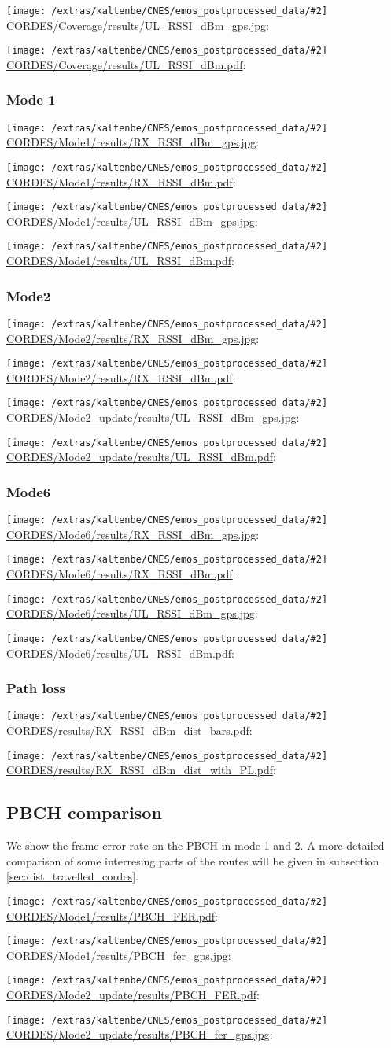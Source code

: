 \documentclass[a4paper,10pt]{article}
\newcommand{\printfile}[2][]{
 \begin{minipage}{8cm}
  \centering
  \texttt{[image: /extras/kaltenbe/CNES/emos\_postprocessed\_data/\#2]}
  \url{#2}: #1

 \end{minipage}
}
\begin{document}
\printfile{CORDES/Coverage/results/UL_RSSI_dBm_gps.jpg}
\printfile{CORDES/Coverage/results/UL_RSSI_dBm.pdf}

\subsubsection{Mode 1}
\printfile{CORDES/Mode1/results/RX_RSSI_dBm_gps.jpg}
\printfile{CORDES/Mode1/results/RX_RSSI_dBm.pdf}

\printfile{CORDES/Mode1/results/UL_RSSI_dBm_gps.jpg}
\printfile{CORDES/Mode1/results/UL_RSSI_dBm.pdf}

\subsubsection{Mode2}

\printfile{CORDES/Mode2/results/RX_RSSI_dBm_gps.jpg}
\printfile{CORDES/Mode2/results/RX_RSSI_dBm.pdf}

\printfile{CORDES/Mode2_update/results/UL_RSSI_dBm_gps.jpg}
\printfile{CORDES/Mode2_update/results/UL_RSSI_dBm.pdf}

\subsubsection{Mode6}
\printfile{CORDES/Mode6/results/RX_RSSI_dBm_gps.jpg}
\printfile{CORDES/Mode6/results/RX_RSSI_dBm.pdf}

\printfile{CORDES/Mode6/results/UL_RSSI_dBm_gps.jpg}
\printfile{CORDES/Mode6/results/UL_RSSI_dBm.pdf}

\subsubsection{Path loss}
\printfile{CORDES/results/RX_RSSI_dBm_dist_bars.pdf}
\printfile{CORDES/results/RX_RSSI_dBm_dist_with_PL.pdf}


\subsection{PBCH comparison}
We show the frame error rate on the PBCH in mode 1 and 2. A more detailed comparison of some interresing parts of the routes will be given in subsection \ref{sec:dist_travelled_cordes}.

\printfile{CORDES/Mode1/results/PBCH_FER.pdf}
\printfile{CORDES/Mode1/results/PBCH_fer_gps.jpg}

\printfile{CORDES/Mode2_update/results/PBCH_FER.pdf}
\printfile{CORDES/Mode2_update/results/PBCH_fer_gps.jpg}
\end{document}

